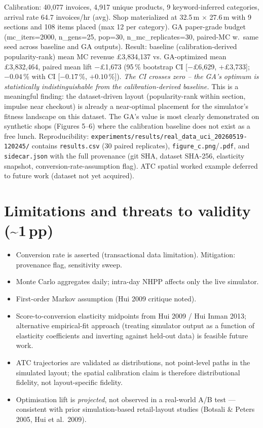 \documentclass[11pt]{article}
\begin{document}
\begin{itemize}[leftmargin=*]
    Calibration: 40{,}077 invoices, 4{,}917 unique products, 9
    keyword-inferred categories, arrival rate 64.7 invoices/hr (avg).
    Shop materialized at 32.5\,m $\times$ 27.6\,m with 9 sections and
    108 items placed (max 12 per category). GA paper-grade budget
    (mc\_iters=2000, n\_gens=25, pop=30, n\_mc\_replicates=30,
    paired-MC w.\ same seed across baseline and GA outputs).
    Result: baseline (calibration-derived popularity-rank) mean MC
    revenue \pounds{}3{,}834{,}137 vs. GA-optimized mean
    \pounds{}3{,}832{,}464, paired mean lift $-$\pounds{}1{,}673
    (95\,\% bootstrap CI [$-$\pounds{}6{,}629, $+$\pounds{}3{,}733];
    $-0.04$\,\% with CI [$-0.17$\,\%, $+0.10$\,\%]).
    \emph{The CI crosses zero -- the GA's optimum is statistically
    indistinguishable from the calibration-derived baseline.} This is
    a meaningful finding: the dataset-driven layout (popularity-rank
    within section, impulse near checkout) is already a near-optimal
    placement for the simulator's fitness landscape on this dataset.
    The GA's value is most clearly demonstrated on synthetic shops
    (Figures 5--6) where the calibration baseline does not exist as
    a free lunch. Reproducibility:
    \texttt{experiments/results/real\_data\_uci\_20260519-120245/}
    contains \texttt{results.csv} (30 paired replicates),
    \texttt{figure\_c.png}/\texttt{.pdf}, and \texttt{sidecar.json}
    with the full provenance (git SHA, dataset SHA-256, elasticity
    snapshot, conversion-rate-assumption flag).
    ATC spatial worked example deferred to future work (dataset not
    yet acquired).
\end{itemize}

\section{Limitations and threats to validity (\textasciitilde 1\,pp)}

\begin{itemize}[leftmargin=*]
  \item Conversion rate is asserted (transactional data limitation).
    Mitigation: provenance flag, sensitivity sweep.
  \item Monte Carlo aggregates daily; intra-day NHPP affects only
    the live simulator.
  \item First-order Markov assumption (Hui 2009 critique noted).
  \item Score-to-conversion elasticity midpoints from
    Hui 2009 / Hui Inman 2013; alternative empirical-fit approach
    (treating simulator output as a function of elasticity
    coefficients and inverting against held-out data) is feasible
    future work.
  \item ATC trajectories are validated as distributions, not
    point-level paths in the simulated layout; the spatial
    calibration claim is therefore distributional fidelity, not
    layout-specific fidelity.
  \item Optimisation lift is \emph{projected}, not observed in a
    real-world A/B test --- consistent with prior simulation-based
    retail-layout studies (Botsali \& Peters 2005, Hui et al.\ 2009).
\end{itemize}
\end{document}
